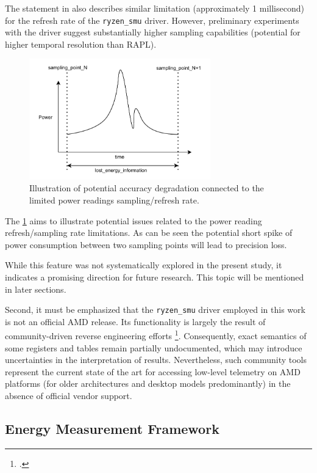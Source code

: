 The statement in \textcite{ryzen_managment_linux} also describes similar
limitation (approximately 1 millisecond) for the refresh rate of the 
\texttt{ryzen\_smu} driver. However, preliminary experiments with the
driver suggest substantially higher sampling capabilities (potential for
higher temporal resolution than \gls{RAPL}).

\begin{figure}[htbp]
    \centering
    \includegraphics[width=0.7\textwidth]{assets/sampling_spike}
    \caption{
        Illustration of potential accuracy degradation connected
        to the limited power readings sampling/refresh rate.
    }
    \label{fig:sampling}
\end{figure}

The \cref{fig:sampling} aims to illustrate potential issues related to the
power reading refresh/sampling rate limitations. As can be seen the potential
short spike of power consumption between two sampling points will lead to
precision loss.

While this feature was not systematically explored in the present study, it
indicates a promising direction for future research. This topic will be
mentioned in later sections.

Second, it must be emphasized that the \texttt{ryzen\_smu} driver employed in
this work is not an official AMD release. Its functionality is largely the
result of community-driven reverse engineering efforts
\footcite{RyzenMonitor_GitHub,ryzen_managment_linux}. Consequently, exact
semantics of some registers and tables remain partially undocumented, which may
introduce uncertainties in the interpretation of results. Nevertheless, such
community tools represent the current state of the art for accessing low-level
telemetry on AMD platforms (for older architectures and desktop models
predominantly) in the absence of official vendor support.

\subsection{Energy Measurement Framework}

